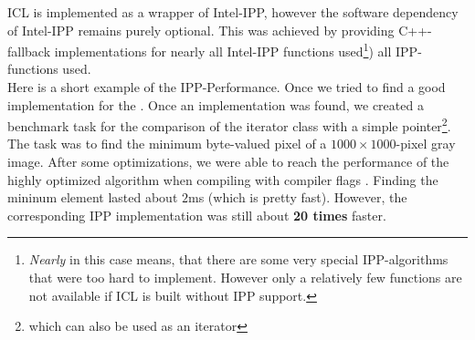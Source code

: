 \begin{enumerate}
ICL is implemented as a wrapper of Intel-IPP, however the software dependency of Intel-IPP remains purely optional. This was achieved by providing C++-fallback implementations for nearly all Intel-IPP functions used\footnote{\emph{Nearly} in this case means, that there are some very special IPP-algorithms that were too hard to implement. However only a relatively few functions are not available if ICL is built without IPP support.}) all IPP-functions used. \\
Here is a short example of the IPP-Performance. Once we tried to find a good implementation for the . Once an implementation was found, we created a benchmark task for the comparison of the iterator class with a simple pointer\footnote{which can also be used as an iterator}. The task was to find the minimum byte-valued pixel of a $1000\times{}1000$-pixel gray image. After some optimizations, we were able to reach the performance of the highly optimized  algorithm when compiling with compiler flags . Finding the mininum element lasted about $2$ms (which is pretty fast). However, the corresponding IPP implementation was still about \textbf{20 times} faster.
\end{enumerate}

